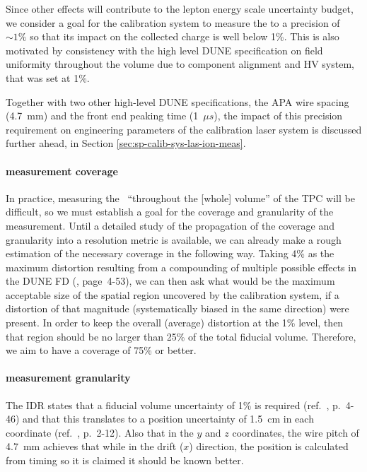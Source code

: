 Since other effects will contribute to the lepton energy scale uncertainty budget, we consider a goal for the calibration system to measure the \efield to a precision of $\sim\num{1}\%$ so that its impact on the collected charge is well below \num{1}\%.
This is also motivated by consistency with the high level DUNE specification on field uniformity throughout the volume due to component alignment and HV system, that was set at \num{1}\%.

Together with two other high-level DUNE specifications, the APA wire spacing (4.7~mm) and the front end peaking time (1~$\mu s$), the impact of this \efield precision requirement on engineering parameters of the calibration laser system is discussed further ahead, in Section \ref{sec:sp-calib-sys-las-ion-meas}.

\paragraph{\efield measurement coverage}

In practice, measuring the \efield  ~``throughout the [whole] volume'' of the TPC will be difficult, 
so we must establish a goal for the coverage and granularity of the measurement. 
Until a detailed study of the propagation of the coverage and granularity into a resolution metric is available, we can already make a rough estimation of the necessary coverage in the following way. Taking \num{4}\% as the maximum \efield distortion resulting from a compounding of multiple possible effects in the DUNE FD (\cite{idr-vol-1}, page~4-53), we can then ask what would be the maximum acceptable size of the spatial region uncovered by the calibration system, if a distortion of that magnitude (systematically biased in the same direction) were present. In order to keep the overall (average) \efield distortion at the \num{1}\% level, then that region should be no larger than \num{25}\% of the total fiducial volume. Therefore, we aim to have a coverage of \num{75}\% or better.

\paragraph{\efield measurement granularity}

The IDR states that a fiducial volume uncertainty of \num{1}\% is required (ref.~\cite{idr-vol-1}, p.~4-46) and that this translates to a position uncertainty of \num{1.5}~cm in each coordinate (ref.~\cite{idr-vol-2}, p.~2-12). Also that in the $y$ and $z$ coordinates, the wire pitch of \num{4.7}~mm achieves that while in the drift ($x$) direction, the position is calculated from timing so it is claimed it should be known better.

